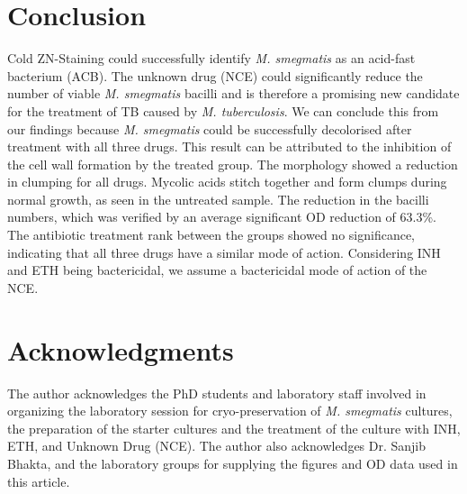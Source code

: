 \documentclass[11pt]{cls/labreport}
\begin{document}
\begin{multicols}{2}
\section{Conclusion}
Cold ZN-Staining  could successfully identify \textit{M. smegmatis} as an acid-fast bacterium (ACB). The unknown drug (NCE) could significantly reduce the number of viable \textit{M. smegmatis} bacilli and is therefore a promising new candidate for the treatment of TB caused by \textit{M. tuberculosis}. 
We can conclude this from our findings because\textit{ M. smegmatis} could be successfully decolorised after treatment with all three drugs. This result can be attributed to the inhibition of the cell wall formation by  the treated group. The morphology showed a reduction in clumping for all drugs. Mycolic acids stitch together and form clumps during normal growth, as seen in the untreated sample. The reduction in the bacilli numbers, which was verified by an average significant OD reduction of 63.3\%. The antibiotic treatment rank between the groups showed no significance, indicating that all three drugs have a similar mode of action. Considering  INH and ETH being bactericidal, we assume a bactericidal mode of action of the NCE.

\section{Acknowledgments}
The author acknowledges the PhD students and laboratory staff involved in organizing the laboratory session for cryo-preservation of\textit{ M. smegmatis} cultures, the preparation of the starter cultures and the treatment of the culture with INH, ETH, and Unknown Drug (NCE). The author also acknowledges Dr. Sanjib Bhakta, and the laboratory groups for supplying the figures and OD data used in this article. 

\printbibliography

\end{multicols}
\end{document}
